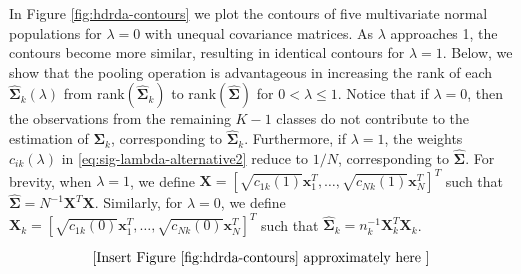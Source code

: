 \documentclass[]{interact}\usepackage[]{graphicx}\usepackage[]{color}
\begin{document}
In Figure \ref{fig:hdrda-contours} we plot the contours of five multivariate
normal populations for $\lambda = 0$ with unequal covariance matrices. As
$\lambda$ approaches 1, the contours become more similar, resulting in identical
contours for $\lambda = 1$. Below, we show that the pooling operation is
advantageous in increasing the rank of each $\widehat{\bm \Sigma}_k(\lambda)$
from rank$(\widehat{\bm \Sigma}_k)$ to rank$(\widehat{\bm \Sigma})$ for $0 <
\lambda \le 1$. Notice that if $\lambda = 0$, then the observations from the
remaining $K - 1$ classes do not contribute to the estimation of $\bm \Sigma_k$,
corresponding to $\widehat{\bm \Sigma}_k$. Furthermore, if $\lambda = 1$, the
weights $c_{ik}(\lambda)$ in \eqref{eq:sig-lambda-alternative2} reduce to $1/N$,
corresponding to $\widehat{\bm \Sigma}$. For brevity, when $\lambda = 1$, we
define $\bm X = [\sqrt{c_{1k}(1)} \bm x_1^{T}, \ldots, \sqrt{c_{Nk}(1)} \bm
  x_N^{T}]^{T}$ such that $\widehat{\bm \Sigma} = N^{-1} \bm X^{T} \bm
X$. Similarly, for $\lambda = 0$, we define $\bm X_k = [\sqrt{c_{1k}(0)} \bm
  x_1^{T}, \ldots, \sqrt{c_{Nk}(0)} \bm x_N^{T}]^{T}$ such that $\widehat{\bm
  \Sigma}_k = n_k^{-1} \bm X_k^{T} \bm X_k$.

\[ \left[\text{Insert Figure \ref{fig:hdrda-contours} approximately here }\right] \]
\end{document}
